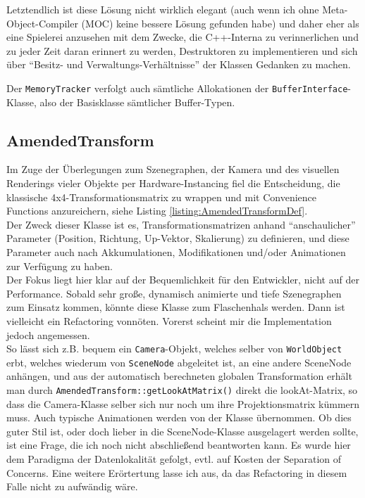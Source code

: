 	Letztendlich ist diese Lösung nicht wirklich elegant (auch wenn ich ohne Meta-Object-Compiler (MOC) keine bessere 	
	Lösung gefunden habe) und daher eher als eine Spielerei anzusehen
	mit dem Zwecke, die C++-Interna zu verinnerlichen und zu jeder Zeit daran erinnert zu werden, 
	Destruktoren zu implementieren und sich über 
	"`Besitz- und Verwaltungs-Verhältnisse"' der Klassen Gedanken zu machen.
	
	Der \lstinline|MemoryTracker| verfolgt auch sämtliche Allokationen der \lstinline|BufferInterface|-Klasse,
	also der Basisklasse sämtlicher Buffer-Typen.
	
\subsection{AmendedTransform}
	\label{sec:AmendedTransform}
 	Im Zuge der Überlegungen zum Szenegraphen, der Kamera und des visuellen Renderings vieler Objekte per
 	Hardware-Instancing fiel die Entscheidung, die klassische 4x4-Transformationsmatrix zu wrappen und mit
 	Convenience Functions anzureichern, siehe Listing \ref{listing:AmendedTransformDef}.\\
 	Der Zweck dieser Klasse ist es, Transformationsmatrizen anhand "`anschaulicher"' Parameter 
 	(Position, Richtung, Up-Vektor, Skalierung) zu definieren,
 	und diese Parameter auch nach Akkumulationen, Modifikationen und/oder Animationen zur Verfügung zu haben.\\
 	Der Fokus liegt hier klar auf der Bequemlichkeit für den Entwickler, nicht auf der Performance.
 	Sobald sehr große, dynamisch animierte und tiefe Szenegraphen zum Einsatz kommen, könnte diese Klasse
 	zum Flaschenhals werden. Dann ist vielleicht ein Refactoring vonnöten. Vorerst scheint mir die Implementation jedoch
 	angemessen.\\
 	
 	So lässt sich z.B. bequem ein \lstinline|Camera|-Objekt, welches selber von \lstinline|WorldObject| erbt,
 	welches wiederum von \lstinline|SceneNode| abgeleitet ist, an eine andere SceneNode anhängen, und aus der automatisch
 	berechneten globalen Transformation erhält man durch \lstinline|AmendedTransform::getLookAtMatrix()|
 	direkt die lookAt-Matrix, so  dass die Camera-Klasse selber sich nur noch um ihre Projektionsmatrix kümmern muss.
 	Auch typische Animationen werden von der Klasse übernommen. Ob dies guter Stil ist, oder doch lieber in die
 	SceneNode-Klasse ausgelagert werden sollte, ist eine Frage, die ich noch nicht abschließend beantworten kann.
 	Es wurde hier dem Paradigma der Datenlokalität gefolgt, evtl. auf Kosten der Separation of Concerns.
 	Eine weitere Erörtertung lasse ich aus, da das Refactoring in diesem Falle nicht zu aufwändig wäre.

